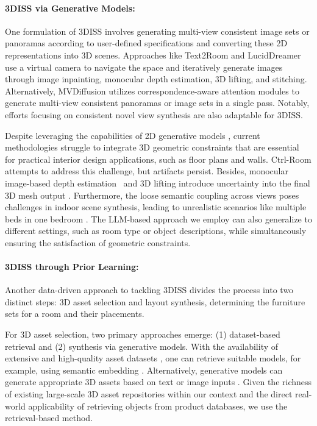 \documentclass[runningheads]{llncs}
\begin{document}
\paragraph{\textbf{3DISS via Generative Models:}}
One formulation of 3DISS involves generating multi-view consistent image sets or panoramas according to user-defined specifications and converting these 2D representations into 3D scenes. Approaches like Text2Room \cite{hollein2023text2room} and LucidDreamer \cite{chung2023luciddreamer} use a virtual camera to navigate the space and iteratively generate images through image inpainting, monocular depth estimation, 3D lifting, and stitching. Alternatively, MVDiffusion \cite{Tang2023mvdiffusion} utilizes correspondence-aware attention modules to generate multi-view consistent panoramas or image sets in a single pass. Notably, efforts \cite{tseng2023consistent, shen2023make, bautista2022gaudi,fridman2024scenescape, yu2023wonderjourney,cai2022diffdreamer,wang2023breathing} focusing on consistent novel view synthesis are also adaptable for 3DISS.

Despite leveraging the capabilities of 2D generative models \cite{ho2020denoising, dhariwal2021diffusion, zhang2023adding, rombach2022high}, current methodologies struggle to integrate 3D geometric constraints that are essential for practical interior design applications, such as floor plans and walls. 
Ctrl-Room \cite{fang2023ctrl} attempts to address this challenge, but artifacts persist.
Besides, monocular image-based depth estimation~\cite{ke2023repurposing} and 3D lifting introduce uncertainty into the final 3D mesh output \cite{hollein2023text2room}. Furthermore, the loose semantic coupling across views poses challenges in indoor scene synthesis, leading to unrealistic scenarios like multiple beds in one bedroom \cite{fang2023ctrl, Tang2023mvdiffusion}. The LLM-based approach we employ can also generalize to different settings, such as room type or object descriptions, while simultaneously ensuring the satisfaction of geometric constraints.

\paragraph{\textbf{3DISS through Prior Learning}:}
Another data-driven approach to tackling 3DISS divides the process into two distinct steps: 3D asset selection and layout synthesis, \ie determining the furniture sets for a room and their placements.

For 3D asset selection, two primary approaches emerge: (1) dataset-based retrieval and (2) synthesis via generative models. With the availability of extensive and high-quality asset datasets \cite{deitke2023objaverse, fu20213d, chang2015shapenet, wu20153d}, one can retrieve suitable models, for example, using semantic embedding \cite{liu2024openshape}. Alternatively, generative models can generate appropriate 3D assets based on text or image inputs \cite{poole2022dreamfusion, long2023wonder3d, hong2023lrm, liu2024one}. Given the richness of existing large-scale 3D asset repositories within our context and the direct real-world applicability of retrieving objects from product databases, we use the retrieval-based method.
\end{document}
